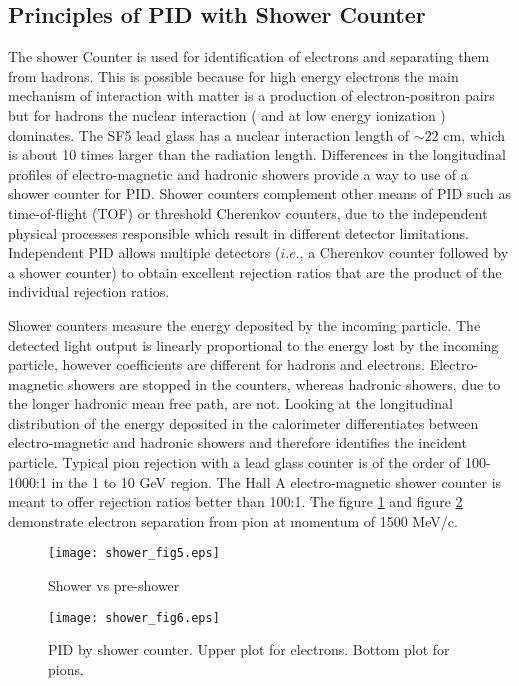 \documentclass[12pt]{article}
\begin{document}
\subsection{Principles of PID with Shower Counter}
The shower Counter is used for identification of electrons and
separating them from hadrons. This is possible because for high energy
electrons the main mechanism of interaction with matter is a
production of electron-positron pairs but for hadrons the nuclear
interaction ( and at low energy ionization ) dominates.  The SF5 lead
glass has a nuclear interaction length of $\sim 22$ cm, which is about
10 times larger than the radiation length. Differences in the
longitudinal profiles of electro-magnetic and hadronic showers provide
a way to use of a shower counter for PID.  Shower counters complement
other means of PID such as time-of-flight (TOF) or threshold Cherenkov
counters, due to the independent physical processes responsible which
result in different detector limitations. Independent PID allows
multiple detectors ($i.e.$, a Cherenkov counter followed by a shower
counter) to obtain excellent rejection ratios that are the product of
the individual rejection ratios.

Shower counters measure the energy deposited by the incoming particle.
The detected light output is linearly proportional to the energy lost
by the incoming particle, however coefficients are different for
hadrons and electrons.  Electro-magnetic showers are stopped in the
counters, whereas hadronic showers, due to the longer hadronic mean
free path, are not.  Looking at the longitudinal distribution of the
energy deposited in the calorimeter differentiates between
electro-magnetic and hadronic showers and therefore identifies the
incident particle.  Typical pion rejection with a lead glass counter
is of the order of 100-1000:1 in the 1 to 10 GeV region.  The Hall A
electro-magnetic shower counter is meant to offer rejection ratios
better than 100:1. The figure \ref{2d_sh_psh} and figure \ref{fen}
demonstrate electron separation from pion at momentum of 1500 MeV/c.
%

\begin{figure}
\begin{center}
\texttt{[image: shower\_fig5.eps]}
{\linespread{1.}
\caption[Typical correlation amplitudes in shower and pre-shower]{Shower vs pre-shower}
\label{2d_sh_psh}}
\end{center}
\end{figure}
%
\begin{figure}
\begin{center}
\texttt{[image: shower\_fig6.eps]}
{\linespread{1.}
\caption[PID parameter fen]{PID by shower counter. Upper plot for electrons. 
Bottom plot for pions.}
\label{fen}}
\end{center}
\end{figure}
%
\end{document}
